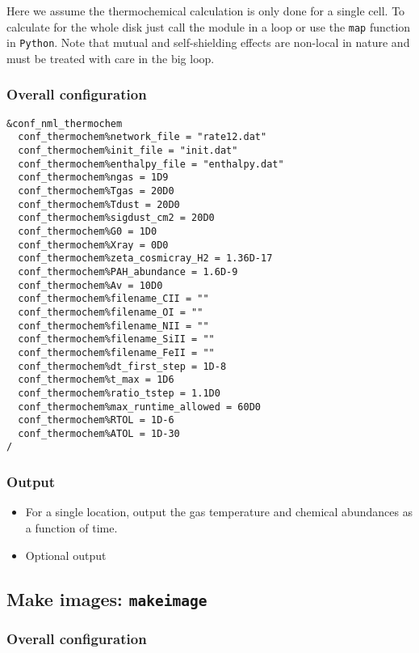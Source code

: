 \documentclass{article}
\newcommand{\cds}[1]{\texttt{#1}}
\newcommand{\python}{\texttt{Python}}
\newcommand{\makeimage}{\texttt{makeimage}}
\begin{document}
Here we assume the thermochemical calculation is only done for a single cell.  To calculate for the whole disk just call the module in a loop or use the \cds{map} function in \python.  Note that mutual and self-shielding effects are non-local in nature and must be treated with care in the big loop.

\subsubsection{Overall configuration}

\begin{lstlisting}
&conf_nml_thermochem
  conf_thermochem%network_file = "rate12.dat"
  conf_thermochem%init_file = "init.dat"
  conf_thermochem%enthalpy_file = "enthalpy.dat"
  conf_thermochem%ngas = 1D9
  conf_thermochem%Tgas = 20D0
  conf_thermochem%Tdust = 20D0
  conf_thermochem%sigdust_cm2 = 20D0
  conf_thermochem%G0 = 1D0
  conf_thermochem%Xray = 0D0
  conf_thermochem%zeta_cosmicray_H2 = 1.36D-17
  conf_thermochem%PAH_abundance = 1.6D-9
  conf_thermochem%Av = 10D0
  conf_thermochem%filename_CII = ""
  conf_thermochem%filename_OI = ""
  conf_thermochem%filename_NII = ""
  conf_thermochem%filename_SiII = ""
  conf_thermochem%filename_FeII = ""
  conf_thermochem%dt_first_step = 1D-8
  conf_thermochem%t_max = 1D6
  conf_thermochem%ratio_tstep = 1.1D0
  conf_thermochem%max_runtime_allowed = 60D0
  conf_thermochem%RTOL = 1D-6
  conf_thermochem%ATOL = 1D-30
/
\end{lstlisting}

\subsubsection{Output}

\begin{itemize}
  \item For a single location, output the gas temperature and chemical abundances as a function of time.
  \item Optional output
\end{itemize}  

\subsection{Make images: \makeimage}

\subsubsection{Overall configuration}
\end{document}
